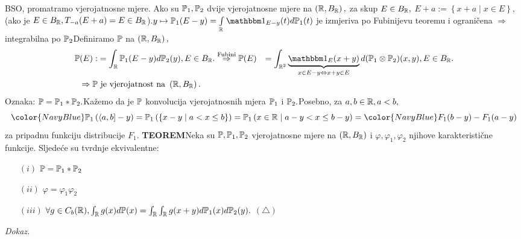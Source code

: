 \documentclass{article}
\begin{document}
BSO, promatramo vjerojatnosne mjere. Ako su \(\Bbb P_1,\Bbb P_2\) dvije vjerojatnosne mjere na \(\left(\Bbb R,B_{\Bbb R}\right),\) za skup \(E\in B_\Bbb R,\) \(E+a:=\left\{x+a\mid x\in E\right\},\) (ako je \(E\in B_{\Bbb R},T_{-a}(E+a)=E\in B_{\Bbb R}\)).\newline \(y\mapsto\Bbb P_1(E-y)=\int\limits_{\Bbb R}\mathbbm 1_{E-y}(t)d\Bbb P_1(t)\) je izmjeriva po Fubinijevu teoremu i ograničena \(\Rightarrow\) integrabilna po \(\Bbb P_2\)\newline Definiramo \(\Bbb P\) na \(\left(\Bbb R,B_{\Bbb R}\right),\) \[\begin{aligned}\Bbb P(E):&=\int_{\Bbb R}\Bbb P_1(E-y)d\Bbb P_2(y),E\in B_{\Bbb R}.\overset{\text{Fubini}}{\Rightarrow}\Bbb P(E)&=\int_{\Bbb R^2}\underbrace{\mathbbm 1_E(x+y)}_{x\in E-y\Leftrightarrow x+y\in E}d(\Bbb P_1\otimes\Bbb P_2)(x,y),E\in B_{\Bbb R}.\\\Rightarrow\Bbb P&\text{ je vjerojatnost na }\left(\Bbb R,B_{\Bbb R}\right).\end{aligned}\] Oznaka: \(\Bbb P=\Bbb P_1*\Bbb P_2.\)\newline Kažemo da je \(\Bbb P\) konvolucija vjerojatnosnih mjera \(\Bbb P_1\) i \(\Bbb P_2.\)\newline Posebno, za \(a,b\in\Bbb R,a<b,\) \[{\color{NavyBlue}\Bbb P_1\left(\langle a,b]-y\right)}=\Bbb P_1\left(\left\{x-y\mid a<x\le b\right\}\right)=\Bbb P_1\left(x\in\Bbb R\mid a-y<x\le b-y\right)={\color{NavyBlue}F_1(b-y)-F_1(a-y)}\] za pripadnu funkciju distribucije \(F_1.\)\newline\newline 
\textbf{TEOREM}\newline Neka su \(\Bbb P,\Bbb P_1,\Bbb P_2\) vjerojatnosne mjere na \(\left(\Bbb R, B_{\Bbb R}\right)\) i \(\varphi,\varphi_1,\varphi_2\) njihove karakteristične funkcije. Sljedeće su tvrdnje ekvivalentne:
\begin{enumerate}
    \item[\((i)\)] \(\Bbb P=\Bbb P_1*\Bbb P_2\)
    \item[\((ii)\)] \(\varphi=\varphi_1\varphi_2\)
    \item[\((iii)\)] \(\forall g\in C_b(\Bbb R),\int_{\Bbb R}g(x)d\Bbb P(x)=\int_{\Bbb R}\int_{\Bbb R}g(x+y)d\Bbb P_1(x)d\Bbb P_2(y).\) \((\triangle)\) 
\end{enumerate}
\textit{Dokaz.}
\end{document}
